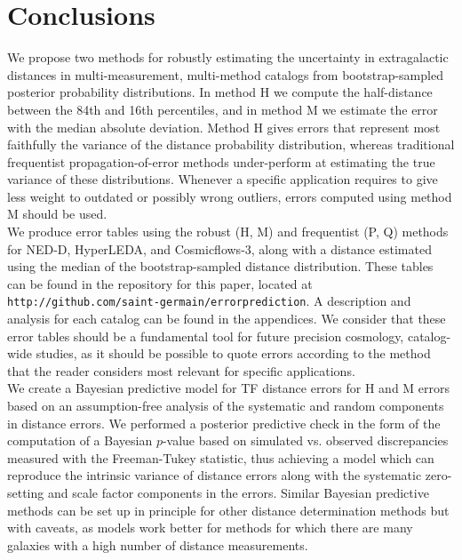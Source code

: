 \documentclass[a4paper,fleqn,usenatbib]{mnras}
\begin{document}
\section{Conclusions}

We propose two methods for robustly estimating the uncertainty in extragalactic distances in multi-measurement, multi-method catalogs from bootstrap-sampled posterior probability distributions. In method H we compute the half-distance between the 84th and 16th percentiles, and in method M we estimate the error with the median absolute deviation. Method H gives errors that represent most faithfully the variance of the distance probability distribution, whereas traditional frequentist propagation-of-error methods under-perform at estimating the true variance of these distributions. Whenever a specific application requires to give less weight to outdated or possibly wrong outliers, errors computed using method M should be used.\\

We produce error tables using the robust (H, M) and frequentist (P, Q) methods for NED-D, HyperLEDA, and Cosmicflows-3, along with a distance estimated using the median of the bootstrap-sampled distance distribution. These tables can be found in the repository for this paper, located at \texttt{http://github.com/saint-germain/errorprediction}. A description and analysis for each catalog can be found in the appendices. We consider that these error tables should be a fundamental tool for future precision cosmology, catalog-wide studies, as it should be possible to quote errors according to the method that the reader considers most relevant for specific applications.\\

We create a Bayesian predictive model for TF distance errors for H and M errors based on an assumption-free analysis of the systematic and random components in distance errors. We performed a posterior predictive check in the form of the computation of a Bayesian $p$-value based on simulated vs. observed discrepancies measured with the Freeman-Tukey statistic, thus achieving a model which can reproduce the intrinsic variance of distance errors along with the systematic zero-setting and scale factor components in the errors. Similar Bayesian predictive methods can be set up in principle for other distance determination methods but with caveats, as models work better for methods for which there are many galaxies with a high number of distance measurements.\\ 
\end{document}
